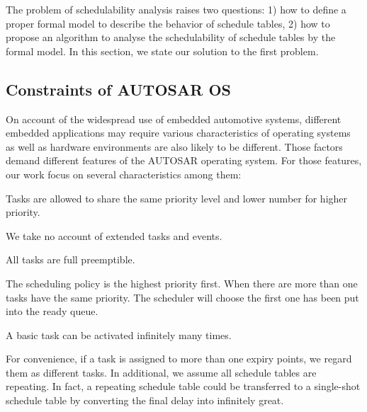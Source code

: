 \documentclass[sigconf]{acmart}
\begin{document}
The problem of schedulability analysis raises two questions: 1) how to define a proper formal model to describe the behavior of schedule tables, 2) how to propose an algorithm to analyse the schedulability of schedule tables by the formal model. In this section, we state our solution to the first problem. 

\subsection{Constraints of AUTOSAR OS}
On account of the widespread use of embedded automotive systems, different embedded applications may require various characteristics of operating systems as well as hardware environments are also likely to be different. Those factors demand different features of the AUTOSAR operating system. For those features, our work focus on several characteristics among them: 
\begin{compactenum}
  \item Tasks are allowed to share the same priority level and lower number for higher priority.
  \item We take no account of extended tasks and events.
  \item All tasks are full preemptible.
  \item The scheduling policy is the highest priority first. When there are more than one tasks have the same priority. The scheduler will choose the first one has been put into the ready queue.
  \item A basic task can be activated infinitely many times. 
\end{compactenum}

For convenience, if a task is assigned to more than one expiry points, we regard them as different tasks. In additional, we assume all schedule tables are repeating. In fact, a repeating schedule table could be transferred to a single-shot schedule table by converting the final delay into infinitely great.
\end{document}
